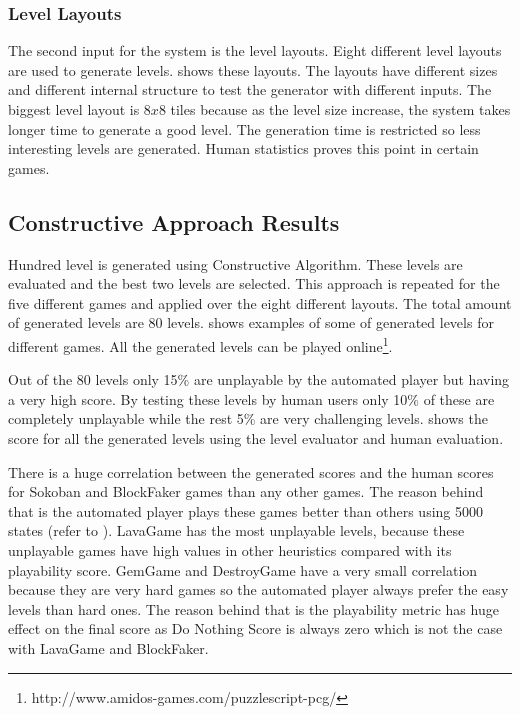 \subsubsection{Level Layouts}
The second input for the system is the level layouts. Eight different level layouts are used to generate levels.  shows these layouts. The layouts have different sizes and different internal structure to test the generator with different inputs. The biggest level layout is $8x8$ tiles because as the level size increase, the system takes longer time to generate a good level. The generation time is restricted so less interesting levels are generated. Human statistics proves this point in certain games.


\subsection{Constructive Approach Results}
Hundred level is generated using Constructive Algorithm. These levels are evaluated and the best two levels are selected. This approach is repeated for the five different games and applied over the eight different layouts. The total amount of generated levels are 80 levels.  shows examples of some of generated levels for different games. All the generated levels can be played online\footnote{http://www.amidos-games.com/puzzlescript-pcg/}.\\\par


Out of the 80 levels only 15\% are unplayable by the automated player but having a very high score. By testing these levels by human users only 10\% of these are completely unplayable while the rest 5\% are very challenging levels.  shows the score for all the generated levels using the level evaluator and human evaluation.\\\par

There is a huge correlation between the generated scores and the human scores for Sokoban and BlockFaker games than any other games. The reason behind that is the automated player plays these games better than others using 5000 states (refer to ). LavaGame has the most unplayable levels, because these unplayable games have high values in other heuristics compared with its playability score. GemGame and DestroyGame have a very small correlation because they are very hard games so the automated player always prefer the easy levels than hard ones. The reason behind that is the playability metric has huge effect on the final score as Do Nothing Score is always zero which is not the case with LavaGame and BlockFaker.

